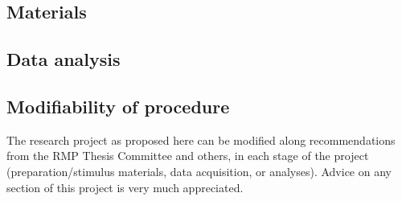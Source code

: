 \documentclass[12pt,a4paper]{article}\usepackage[]{graphicx}\usepackage[]{color}
\begin{document}
\subsection{Materials}

\subsection{Data analysis}

\subsection{Modifiability of procedure}
The research project as proposed here can be modified along recommendations from the RMP Thesis Committee and others, in each stage of the project (preparation/stimulus materials, data acquisition, or analyses). Advice on any section of this project is very much appreciated. \\
\end{document}

